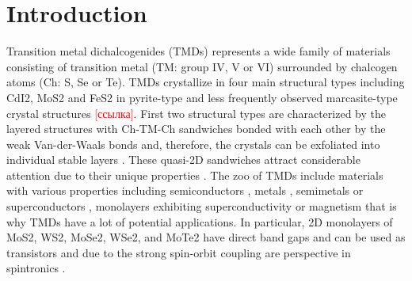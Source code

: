\documentclass[a4paperm]{article}
\begin{document}
\section*{Introduction}
Transition metal dichalcogenides (TMDs) represents a wide family of materials consisting of transition metal (TM: group IV, V or VI) surrounded by chalcogen atoms (Ch: S, Se or Te). TMDs crystallize in four main structural types including CdI2, MoS2 and FeS2 in pyrite-type and less frequently observed marcasite-type crystal structures \textcolor{red}{[ссылка]}.
First two structural types are characterized by the layered structures with Ch-TM-Ch sandwiches bonded with each other by the weak Van-der-Waals bonds and, therefore, the crystals can be exfoliated into individual stable layers \cite{zhang2020intercalation}. These quasi-2D sandwiches attract considerable attention due to their unique properties \cite{li2017graphene, SHI20181, xi2016ising, hu2019recent, pi2019recent}. The zoo of TMDs include materials with various properties including semiconductors \cite{nayeri2018transport}, metals \cite{zhao20212d}, semimetals \cite{xu2020high, zhao2020observation} or superconductors \cite{wang2020nodeless}, monolayers exhibiting superconductivity \cite{hsu2017topological} or magnetism \cite{guo2020electronic} that is why TMDs have a lot of potential applications. In particular, 2D monolayers of MoS2, WS2, MoSe2, WSe2, and MoTe2 have direct band gaps \cite{dybala2016pressure, huang2016controlling} and can be used as transistors \cite{sebastian2021benchmarking} and due to the strong spin-orbit coupling \cite{rossi2020van, zhou2019spin} are perspective in spintronics \cite{ahn20202d, zibouche2014transition}.
\end{document}
